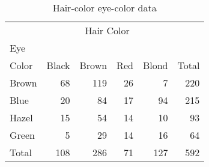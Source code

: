 \begin{table}[htb]

\caption{Hair-color eye-color data}\label{tab:hairdat}
\begin{center}
\begin{tabular}{l|rrrr|r}
\hline
        & \multicolumn{4}{c|}{Hair Color}        & \\
Eye     &         &         &         &         &       \\
Color   &  Black  &  Brown  &    Red  &  Blond  & Total \\\hline
Brown   &     68  &    119  &     26  &      7  &   220 \\
Blue    &     20  &     84  &     17  &     94  &   215 \\
Hazel   &     15  &     54  &     14  &     10  &    93 \\
Green   &      5  &     29  &     14  &     16  &    64 \\ \hline
Total   &    108  &    286  &     71  &    127  &   592 \\ \hline
\end{tabular}
\end{center}
\end{table}

